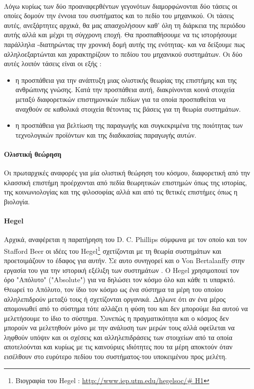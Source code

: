 \documentclass[a4paper,12pt,twoside]{report}
\begin{document}
{			\paragraph{}{Λόγω κυρίως των δύο προαναφερθέντων γεγονότων διαμορφώνονται δύο τάσεις οι οποίες δομούν την έννοια του συστήματος και το πεδίο του μηχανικού. Οι τάσεις αυτές, ανεξάρτητες αρχικά, θα μας απασχολήσουν καθ' όλη τη διάρκεια της περιόδου αυτής αλλά και μέχρι τη σύγχρονη εποχή. Θα προσπαθήσουμε να τις ιστορήσουμε παράλληλα -διατηρώντας την χρονική δομή αυτής της ενότητας- και να δείξουμε πως αλληλοεξαρτώνται και χαρακτηρίζουν το πεδίου του μηχανικού συστημάτων. Οι δύο αυτές λοιπόν τάσεις είναι οι εξής :
			\begin{itemize}
				\item η προσπάθεια για την ανάπτυξη μιας ολιστικής θεωρίας της επιστήμης και της ανθρώπινης γνώσης. Κατά την προσπάθεια αυτή, διακρίνονται κοινά στοιχεία μεταξύ διαφορετικών επιστημονικών πεδίων για τα οποία προσπαθείται να αναχθούν σε καθολικά στοιχεία θέτοντας τις βάσεις για τη θεωρία συστημάτων.
				\item η προσπάθεια για βελτίωση της παραγωγής και συγκεκριμένα της ποιότητας των τεχνολογικών προϊόντων και της διαδικασίας παραγωγής αυτών.
			\end{itemize} 
			}
			
			\paragraph{Ολιστική θεώρηση}{Οι πρωταρχικές αναφορές για μία ολιστική θεώρηση του κόσμου, διαφορετική από την κλασσική επιστήμη προέρχονται από πεδία θεωρητικών επιστημών όπως της ιστορίας, της κοινωνιολογίας και της φιλοσοφίας αλλά και από τις θετικές επιστήμες όπως η βιολογία.
			}
			\paragraph{Hegel}{Αρχικά, αναφέρεται η παρατήρηση του D. C. Phillips σύμφωνα με τον οποίο \cite[σελ. 5]{SystemsTheoryADiscreditedPhilosophy:Phillips1969} και τον Stafford Beer οι ιδέες του Hegel\footnote{Βιογραφία του Hegel : \url{http://www.iep.utm.edu/hegelsoc/\# H1}} σχετίζονται με τη θεωρία συστημάτων και προετοιμάζουν το έδαφος για αυτήν. Σε αυτο συνηγορεί και ο Von Bertalanffy στην εργασία του για την ιστορική εξέλιξη των συστημάτων \cite{TheHistoryΑndStatusΟfGeneralSystemsTheory:Bertalanffy}. Ο Hegel χρησιμοποιεί τον όρο "Απόλυτο" ("Absolute") για να δηλώσει τον κόσμο όλο και κάθε τι υπαρκτό.  Θεωρεί το Απόλυτο, τον ίδιο τον κόσμο ως ένα σύστημα τα μέρη του οποίου αλληλεπιδρούν μεταξύ τους ή σχετίζονται οργανικά.  Δήλωνε ότι αν ένα μέρος απομονωθεί από το σύστημα τότε αλλάζει η φύση του και δεν μπορούμε δια αυτού να μελετήσουμε το ίδιο το σύστημα. Συνεπώς η πραγματικότητα και ο κόσμος δεν μπορούν να μελετηθούν μόνο με την ανάλυση των μερών τους αλλά οφείλεται να ληφθούν υπόψιν και οι σχέσεις και αλληλεπιδράσεις των στοιχείων από τα οποία αποτελούνται και κυρίως με τις καινούριες ιδιότητες που τα μέρη αποκτούν όταν εισέλθουν στο ευρύτερο πεδίου του συστήματος-του υποκειμένου προς μελέτη.
			}
}
\end{document}
